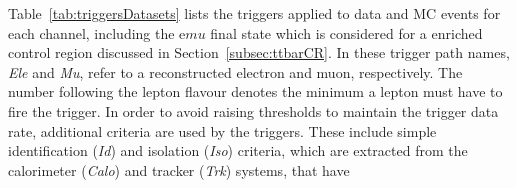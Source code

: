 Table~\ref{tab:triggersDatasets} lists the triggers applied to data and MC events for each channel, including the e$mu$ final state which is considered for a \ttbar enriched control region discussed in Section~\ref{subsec:ttbarCR}.
In these trigger path names, \emph{Ele} and \emph{Mu}, refer to a reconstructed electron and muon, respectively.
The number following the lepton flavour denotes the minimum \pT a lepton must have to fire the trigger.
In order to avoid raising \pT thresholds to maintain the trigger data rate, additional criteria are used by the triggers.
These include simple identification (\emph{Id}) and isolation (\emph{Iso}) criteria, which are extracted from the calorimeter (\emph{Calo}) and tracker (\emph{Trk}) systems, that have 


\begin{table}[htbp]
\label{tab:triggersDatasets}
  \centering
\end{table}

